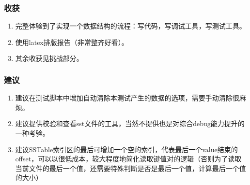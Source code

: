 \documentclass{ctexart}
\begin{document}
\subsubsection{收获}
\begin{enumerate}
  \item 完整体验到了实现一个数据结构的流程：写代码，写调试工具，写测试工具。
  \item 使用latex排版报告（非常整齐好看）。
  \item 其余收获见挑战部分。
\end{enumerate}

\subsubsection{建议}
\begin{enumerate}
  \item 建议在测试脚本中增加自动清除本测试产生的数据的选项，需要手动清除很麻烦。
  \item 建议提供校验和查看sst文件的工具，当然不提供也是对综合debug能力提升的一种考验。
  \item 建议SSTable索引区的最后可增加一个空的索引，代表最后一个value结束的offset，可以以很低成本，较大程度地简化读取键值对的逻辑（否则为了读取当前文件的最后一个值，还需要特殊判断是否是最后一个值，计算最后一个值的大小）
\end{enumerate}
\end{document}
